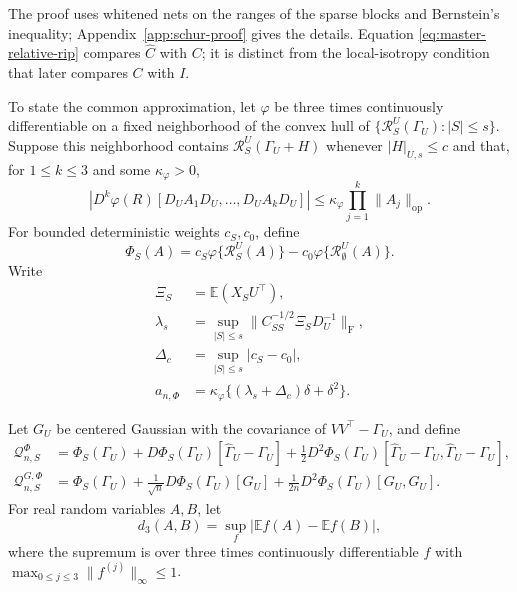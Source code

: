 \documentclass[a4paper,11pt,english]{article}
\newcommand{\E}{\mathbb E}
\begin{document}
The proof uses whitened nets on the ranges of the sparse blocks and
Bernstein's inequality; Appendix~\ref{app:schur-proof} gives the details.  Equation
\eqref{eq:master-relative-rip} compares $\hat C$ with $C$; it is distinct
from the local-isotropy condition that later compares $C$ with $I$.

To state the common approximation, let $\varphi$ be three times
continuously differentiable on a fixed neighborhood of the convex hull of
$\{\mathcal R_S^U(\Gamma_U):|S|\le s\}$.  Suppose this neighborhood contains
$\mathcal R_S^U(\Gamma_U+H)$ whenever $|H|_{U,s}\le c$ and that, for
$1\le k\le3$ and some $\kappa_\varphi>0$,
\begin{equation}\label{eq:master-standardized-derivatives}
 \left|D^k\varphi(R)
 [D_UA_1D_U,\ldots,D_UA_kD_U]\right|
 \le\kappa_\varphi\prod_{j=1}^k\|A_j\|_{\mathrm{op}}.
\end{equation}
For bounded deterministic weights $c_S,c_0$, define
\begin{equation}\label{eq:master-functional}
 \Phi_S(A)=c_S\varphi\{\mathcal R_S^U(A)\}
 -c_0\varphi\{\mathcal R_\emptyset^U(A)\}.
\end{equation}
Write
\begin{equation}\label{eq:master-scales}
\begin{split}
 \Xi_S&=\E(X_SU^\top),\\
 \lambda_s&=\sup_{|S|\le s}
 \|C_{SS}^{-1/2}\Xi_SD_U^{-1}\|_{\mathrm F},\\
 \Delta_c&=\sup_{|S|\le s}|c_S-c_0|,\\
 a_{n,\Phi}&=\kappa_\varphi
 \{(\lambda_s+\Delta_c)\delta+\delta^2\}.
\end{split}
\end{equation}

Let $G_U$ be centered Gaussian with the covariance of
$VV^\top-\Gamma_U$, and define
\begin{align}
 \mathcal Q_{n,S}^{\Phi}
 &=\Phi_S(\Gamma_U)+D\Phi_S(\Gamma_U)[\hat\Gamma_U-\Gamma_U]
 +\frac12D^2\Phi_S(\Gamma_U)
 [\hat\Gamma_U-\Gamma_U,\hat\Gamma_U-\Gamma_U],
 \label{eq:master-empirical-field}\\
 \mathcal Q_{n,S}^{G,\Phi}
 &=\Phi_S(\Gamma_U)+\frac1{\sqrt n}D\Phi_S(\Gamma_U)[G_U]
 +\frac1{2n}D^2\Phi_S(\Gamma_U)[G_U,G_U].
 \label{eq:master-gaussian-field}
\end{align}
For real random variables $A,B$, let
\[
 d_3(A,B)=\sup_f|\E f(A)-\E f(B)|,
\]
where the supremum is over three times continuously differentiable $f$
with $\max_{0\le j\le3}\|f^{(j)}\|_\infty\le1$.
\end{document}
